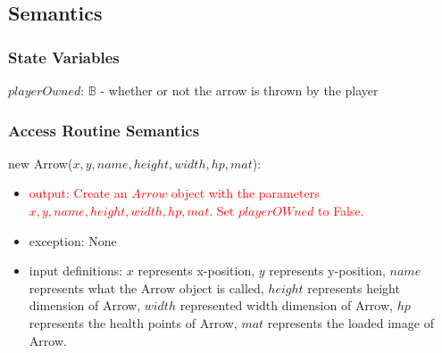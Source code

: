 \documentclass[12pt]{article}
\newcommand{\m}[1]{\mbox{#1}}
\begin{document}
\subsection*{Semantics}

\subsubsection*{State Variables}

$playerOwned$: $\mathbb{B}$ - whether or not the arrow is thrown by the player






\subsubsection*{Access Routine Semantics}

new Arrow($x, y, name, height, width, hp, mat$):
\begin{itemize}
    \item \textcolor{red}{output: Create an $Arrow$ object with the parameters $x, y, name, height, width, hp, mat$. Set $playerOWned$ to False.}
    \item exception: None
    \item input definitions: $x$ represents x-position, $y$ represents y-position, $name$ represents what the Arrow object is called, $height$ represents height dimension of Arrow, $width$ represented width dimension of Arrow, $hp$ represents the health points of Arrow, $mat$ represents the loaded image of Arrow.
\end{itemize}
\end{document}
